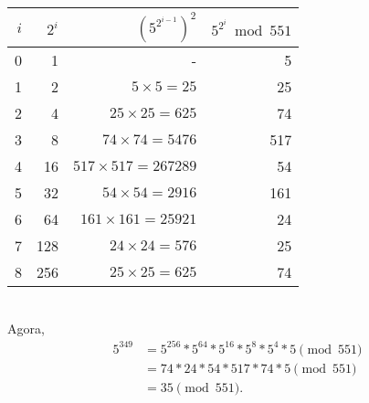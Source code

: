 \documentclass{article}
\begin{document}
\begin{tabular}{r r r r}
    $i$ & $2^i$ & $(5^{2^{i-1}})^2$ & $5^{2^i} \bmod 551$ \\
    \toprule
    0 & 1 & - & 5 \\
    1 & 2 & $5 \times 5 = 25$ & 25 \\
    2 & 4 & $25 \times 25 = 625$ & 74 \\
    3 & 8 & $74 \times 74 = 5476$ & 517 \\
    4 & 16 & $517 \times 517 = 267289$ & 54 \\
    5 & 32 & $54 \times 54 = 2916$ & 161 \\
    6 & 64 & $161 \times 161 = 25921$ & 24 \\
    7 & 128 & $24 \times 24 = 576$ & 25 \\
    8 & 256 & $25 \times 25 = 625$ & 74 \\
\end{tabular}
\\[1em]
Agora,
\begin{align*}
    5^{349} &= 5^{256} * 5^{64} * 5^{16} * 5^8 * 5^4 * 5 \pmod{551} \\
            &= 74 * 24 * 54 * 517 * 74 * 5 \pmod{551} \\
            &= 35 \pmod{551}.
\end{align*}
\end{document}
